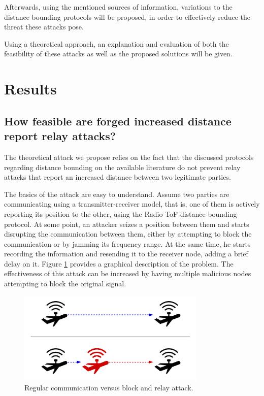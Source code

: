 \documentclass{article}
\begin{document}
Afterwards, using the mentioned sources of information, variations to the distance bounding protocols will be proposed, in order to effectively reduce the threat these attacks pose.

Using a theoretical approach, an explanation and evaluation of both the feasibility of these attacks as well as the proposed solutions will be given.











\section{Results}
\label{sec:results}

\subsection{How feasible are forged increased distance report relay attacks?}

The theoretical attack we propose relies on the fact that the discussed protocols regarding distance bounding on the available literature do not prevent relay attacks that report an increased distance between two legitimate parties.

The basics of the attack are easy to understand. Assume two parties are communicating using a transmitter-receiver model, that is, one of them is actively reporting its position to the other, using the Radio ToF distance-bounding protocol\cite{rasmussen2010realization}. At some point, an attacker seizes a position between them and starts disrupting the communication between them, either by attempting to block the communication or by jamming its frequency range. At the same time, he starts recording the information and resending it to the receiver node, adding a brief delay on it. Figure \ref{fig:attackexample1} provides a graphical description of the problem. The effectiveness of this attack can be increased by having multiple malicious nodes attempting to block the original signal.

\begin{figure}[h!]
  \centering
    \includegraphics[width=0.8\textwidth]{images/attack1.png}
  \caption{Regular communication versus block and relay attack.}
  \label{fig:attackexample1}
\end{figure}
\end{document}
